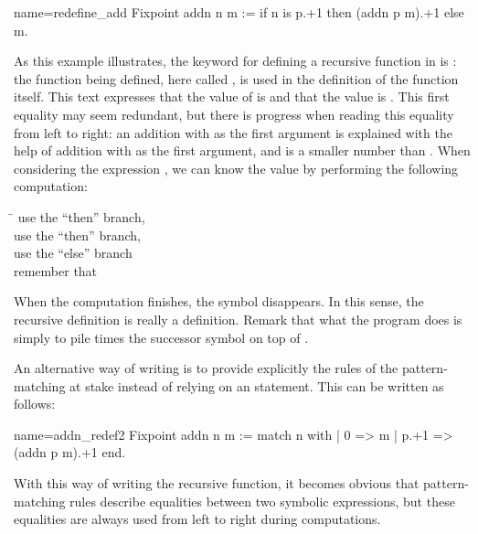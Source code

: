 \begin{coq}{name=redefine_add}{}
Fixpoint addn n m :=
  if n is p.+1 then (addn p m).+1 else m.
\end{coq}
As this example illustrates, the keyword for defining a recursive
function in \Coq{} is : the function being
defined, here called , is used in the definition of the
function  itself.  This text expresses that the value of
 is
 and that the value  is .
This first equality may
seem redundant, but there is progress when reading this equality from
left to right: an addition with  as the first argument
is explained with the help of addition with  as the first
argument, and  is a smaller number than .  When considering the
expression , we can know the value by performing the following
computation:
\begin{tabbing}
\=\kill
{} \> use the ``then'' branch, \\
 \> use the ``then'' branch, \\
 \> use the ``else'' branch\\
\> remember that 
\end{tabbing}
When the computation finishes, the symbol  disappears.  In
this sense, the recursive definition is really a definition.  Remark that
what the  program does is simply to pile  times the
successor symbol on top of .

An alternative way of writing  is to provide explicitly the
rules of the pattern-matching at stake instead of relying on an 
statement. This can be written as follows:

\begin{coq}{name=addn_redef2}{}
Fixpoint addn n m :=
  match n with
  | 0 => m
  | p.+1 => (addn p m).+1
  end.
\end{coq}
With this way of writing the recursive function, it becomes obvious that
pattern-matching rules describe equalities between two symbolic
expressions, but these equalities are always used from left to right during
computations.

